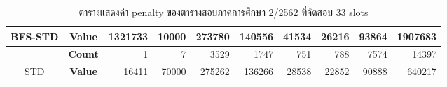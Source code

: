 \begin{table}[]
{\begin{tabular}{@{}ccrrrrrrrr@{}}
    \multirow{-2}{*}{BFS-STD}                    & \textbf{Value}                        & 1321733                        & 10000                          & 273780                         & 140556                         & 41534                          & 26216                          & 93864                          & 1907683                          \\ \midrule
                                                  & {\textbf{Count}} & {1}       & {7}       & {3529}    & {1747}    & {751}     & {788}     & {7574}    & {14397}     \\ \cmidrule(l){2-10} 
    \multirow{-2}{*}{STD} & {\textbf{Value}} & {16411}   & {70000}   & {275262}  & {136266}  & {28538}   & {22852}   & {90888}   & {640217}    \\ \bottomrule
    \end{tabular}%
    }
    \caption{ตารางแสดงค่า penalty ของตารางสอบภาคการศึกษา 2/2562 ที่จัดสอบ 33 slots}
    \label{tab:result_table_262_33}
\end{table}
